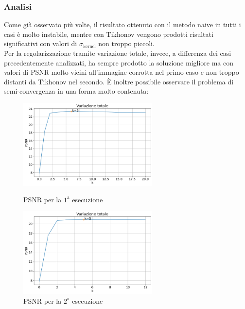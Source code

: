 \documentclass[11pt]{article}
\begin{document}
\subsubsection{Analisi}
Come già osservato più volte, il risultato ottenuto con il metodo naive in tutti i casi è molto instabile, 
mentre con Tikhonov vengono prodotti risultati significativi con valori di $\sigma_{\text{kernel}}$ non troppo piccoli.\\
Per la regolarizzazione tramite variazione totale, invece, a differenza dei casi precedentemente analizzati, ha sempre prodotto la soluzione migliore ma con valori di PSNR molto vicini all'immagine corrotta nel primo caso e non troppo distanti da Tikhonov nel secondo.
È inoltre possibile osservare il problema di semi-convergenza in una forma molto contenuta:
\begin{figure}[H]
    \centering
    \begin{minipage}{0.45\textwidth}
        \centering
        \includegraphics[width=7cm]{reale/1/1/tv_semiconvergenza.png}
        \caption{PSNR per la $1^{\text{a}}$ esecuzione}
    \label{fig:semiconvergenza_reale1_1}
    \end{minipage}\hfill
    \begin{minipage}{0.45\textwidth}
        \centering
        \includegraphics[width=7cm]{reale/1/2/tv_semiconvergenza.png}
        \caption{PSNR per la $2^{\text{a}}$ esecuzione}
    \label{fig:semiconvergenza_reale1_2}
    \end{minipage}
\end{figure}
\end{document}
